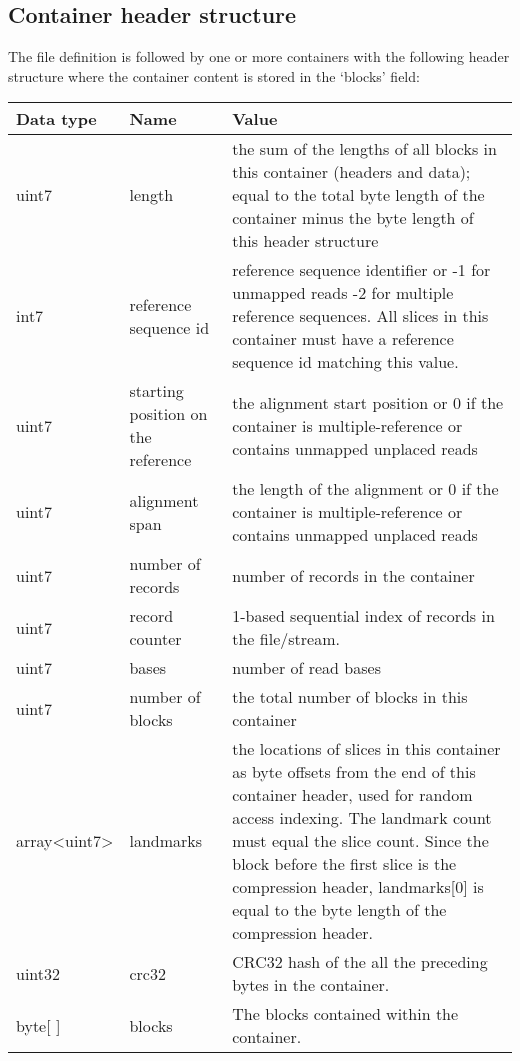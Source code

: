 \documentclass[a4paper]{article}
\begin{document}
\subsection{Container header structure}

The file definition is followed by one or more containers with the following header 
structure where the container content is stored in the `blocks' field:

\begin{tabular}{|l|>{\raggedright}p{120pt}|>{\raggedright}p{260pt}|}
\hline
\textbf{Data type} & \textbf{Name} & \textbf{Value}
\tabularnewline
\hline
uint7 & length & the sum of the lengths of all blocks in this container (headers and data);
equal to the total byte length of the container minus the byte length of this header structure\tabularnewline
\hline
int7 & reference sequence id & reference sequence identifier  or\linebreak{}
-1 for unmapped reads\linebreak{}
-2 for multiple reference sequences.\linebreak{}
All slices in this container must have a reference sequence id matching this value.\tabularnewline
\hline
uint7 & starting position on the reference & the alignment start position or\linebreak{}
0 if the container is multiple-reference
or contains unmapped unplaced reads\tabularnewline
\hline
uint7 & alignment span & the length of the alignment or\linebreak{}
0 if the container is multiple-reference
or contains unmapped unplaced reads\tabularnewline
\hline
uint7 & number of records & number of records in the container\tabularnewline
\hline
uint7 & record counter & 1-based sequential index of records in the file/stream.\tabularnewline
\hline
uint7 & bases & number of read bases\tabularnewline
\hline
uint7 & number of blocks & the total number of blocks in this container\tabularnewline
\hline
array<uint7> & landmarks & the locations of slices in this container as byte offsets from the end of 
this container header, used for random access indexing.
The landmark count must equal the slice count.\linebreak{}
Since the block before the first slice is the compression header,
landmarks[0] is equal to the byte length of the compression header.\tabularnewline
\hline
uint32 & crc32 & CRC32 hash of the all the preceding bytes in the container.\tabularnewline
\hline
byte[ ] & blocks & The blocks contained within the container.\tabularnewline
\hline
\end{tabular}
\end{document}
